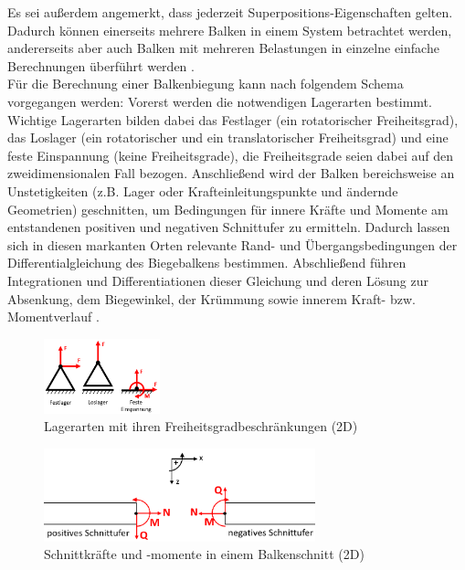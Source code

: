 \noindent Es sei außerdem angemerkt, dass jederzeit Superpositions-Eigenschaften gelten. Dadurch können einerseits mehrere Balken in einem System betrachtet werden, andererseits aber auch Balken mit mehreren Belastungen in einzelne einfache Berechnungen überführt werden \cite{item16}.\\

\noindent Für die Berechnung einer Balkenbiegung kann nach folgendem Schema vorgegangen werden: Vorerst werden die notwendigen Lagerarten bestimmt. Wichtige Lagerarten bilden dabei das Festlager (ein rotatorischer Freiheitsgrad), das Loslager (ein rotatorischer und ein translatorischer Freiheitsgrad) und eine feste Einspannung (keine Freiheitsgrade), die Freiheitsgrade seien dabei auf den zweidimensionalen Fall bezogen. Anschließend wird der Balken bereichsweise an  Unstetigkeiten (z.B. Lager oder Krafteinleitungspunkte und ändernde Geometrien) geschnitten, um Bedingungen für innere Kräfte und Momente am entstandenen positiven und negativen Schnittufer zu ermitteln. Dadurch lassen sich in diesen markanten Orten relevante Rand- und Übergangsbedingungen der Differentialgleichung des Biegebalkens bestimmen. Abschließend führen Integrationen und Differentiationen dieser Gleichung und deren Lösung  zur Absenkung, dem Biegewinkel, der Krümmung sowie innerem Kraft- bzw. Momentverlauf \cite{item16}\cite{item9}.
\begin{figure}[h]
	\centering
	\includegraphics[width=0.3\textwidth]{Bilder/Einspannungen.png}
	\caption{Lagerarten mit ihren Freiheitsgradbeschränkungen (2D)}
\end{figure}
\begin{figure}[h]
	\centering
	\includegraphics[width=0.7\textwidth]{Bilder/Schnittufer.png}
	\caption{Schnittkräfte und -momente in einem Balkenschnitt (2D)}
\end{figure}

\FloatBarrier
\newpage


